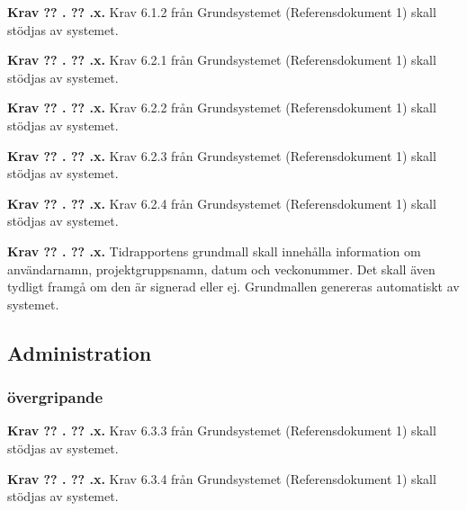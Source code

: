 \documentclass[a4paper]{article}
\newcommand\getcurrentref[1]{%
 \ifnumequal{\value{#1}}{0}
  {??}
  {\the\value{#1}}%
}
\newcommand\requirement[2]{
	\numberedrow{Krav}{#1}{#2}
}
\newcommand\numberedrow[3]{
	\noindent
	\textbf{#1 \getcurrentref{section}.\getcurrentref{subsection}.#2.} #3
	
}
\begin{document}
			\requirement{x}{Krav 6.1.2 från Grundsystemet (Referensdokument 1) skall stödjas av systemet.}
			\requirement{x}{Krav 6.2.1 från Grundsystemet (Referensdokument 1) skall stödjas av systemet.}
			\requirement{x}{Krav 6.2.2 från Grundsystemet (Referensdokument 1) skall stödjas av systemet.}
			\requirement{x}{Krav 6.2.3 från Grundsystemet (Referensdokument 1) skall stödjas av systemet.}
			\requirement{x}{Krav 6.2.4 från Grundsystemet (Referensdokument 1) skall stödjas av systemet.}
			\requirement{x}{Tidrapportens grundmall skall innehålla information om användarnamn, projektgruppsnamn, datum och veckonummer. Det skall även tydligt framgå om den är signerad eller ej. Grundmallen genereras automatiskt av systemet.}


	\subsection{Administration}
		\label{krav-funk-admin}
		\subsubsection*{övergripande}
			\requirement{x}{Krav 6.3.3 från Grundsystemet (Referensdokument 1) skall stödjas av systemet.}		
			\requirement{x}{Krav 6.3.4 från Grundsystemet (Referensdokument 1) skall stödjas av systemet.}
\end{document}
